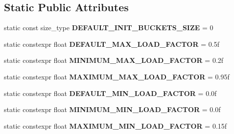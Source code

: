 \subsection*{Static Public Attributes}
\begin{DoxyCompactItemize}
\item 
\mbox{\label{classtsl_1_1detail__robin__hash_1_1robin__hash_a0603fdd5f8077d7a47cd94f9f9c1659f}} 
static const size\+\_\+type {\bfseries D\+E\+F\+A\+U\+L\+T\+\_\+\+I\+N\+I\+T\+\_\+\+B\+U\+C\+K\+E\+T\+S\+\_\+\+S\+I\+ZE} = 0
\item 
\mbox{\label{classtsl_1_1detail__robin__hash_1_1robin__hash_aa3ae0a8d79a3d44851f8194f4537793a}} 
static constexpr float {\bfseries D\+E\+F\+A\+U\+L\+T\+\_\+\+M\+A\+X\+\_\+\+L\+O\+A\+D\+\_\+\+F\+A\+C\+T\+OR} = 0.\+5f
\item 
\mbox{\label{classtsl_1_1detail__robin__hash_1_1robin__hash_aa9fed0463889b71755137f0b910579e2}} 
static constexpr float {\bfseries M\+I\+N\+I\+M\+U\+M\+\_\+\+M\+A\+X\+\_\+\+L\+O\+A\+D\+\_\+\+F\+A\+C\+T\+OR} = 0.\+2f
\item 
\mbox{\label{classtsl_1_1detail__robin__hash_1_1robin__hash_a1ff7a2f75d4d932ca73eda86e41cc70c}} 
static constexpr float {\bfseries M\+A\+X\+I\+M\+U\+M\+\_\+\+M\+A\+X\+\_\+\+L\+O\+A\+D\+\_\+\+F\+A\+C\+T\+OR} = 0.\+95f
\item 
\mbox{\label{classtsl_1_1detail__robin__hash_1_1robin__hash_a102b83e294ce89c1924b023edca9c350}} 
static constexpr float {\bfseries D\+E\+F\+A\+U\+L\+T\+\_\+\+M\+I\+N\+\_\+\+L\+O\+A\+D\+\_\+\+F\+A\+C\+T\+OR} = 0.\+0f
\item 
\mbox{\label{classtsl_1_1detail__robin__hash_1_1robin__hash_ae6d76e10791e5b0c92707623e9cbf66d}} 
static constexpr float {\bfseries M\+I\+N\+I\+M\+U\+M\+\_\+\+M\+I\+N\+\_\+\+L\+O\+A\+D\+\_\+\+F\+A\+C\+T\+OR} = 0.\+0f
\item 
\mbox{\label{classtsl_1_1detail__robin__hash_1_1robin__hash_a62f3c366d670a5a0ad3f3f7ac3f6849b}} 
static constexpr float {\bfseries M\+A\+X\+I\+M\+U\+M\+\_\+\+M\+I\+N\+\_\+\+L\+O\+A\+D\+\_\+\+F\+A\+C\+T\+OR} = 0.\+15f
\end{DoxyCompactItemize}



